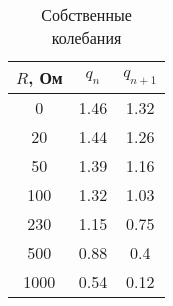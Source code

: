 \documentclass[a4paper, usenames, dvipsnames]{article}
\begin{document}
\begin{table}[p]
    \centering
    \begin{tabular}{|c|c|c|}
        \hline
        $R$, Ом & $q_n$ & $q_{n+1}$ \\
        \hline
        0       & 1.46  & 1.32      \\
        \hline
        20      & 1.44  & 1.26      \\
        \hline
        50      & 1.39  & 1.16      \\
        \hline
        100     & 1.32  & 1.03      \\
        \hline
        230     & 1.15  & 0.75      \\
        \hline
        500     & 0.88  & 0.4       \\
        \hline
        1000    & 0.54  & 0.12      \\
        \hline
    \end{tabular}
    \caption{Собственные колебания}
\end{table}
\end{document}
